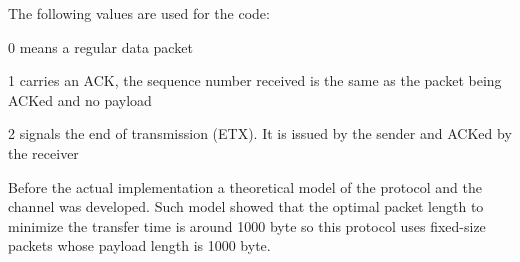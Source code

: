 \documentclass[10pt,twocolumn]{article}
\begin{document}
The following values are used for the code:
\begin{compactitem}
\item 0 means a regular data packet
\item 1 carries an ACK, the sequence number received is the same as the packet
	being ACKed and no payload
\item 2 signals the end of transmission (ETX). It is issued by the sender and
	ACKed by the receiver
\end{compactitem}

Before the actual implementation a theoretical model of the protocol and the
channel was developed. Such model showed that the optimal packet length to
minimize the transfer time is around 1000 byte so this protocol uses fixed-size
packets whose payload length is 1000 byte.
\end{document}
